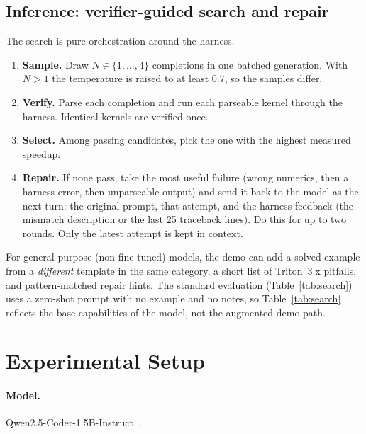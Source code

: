 \documentclass[11pt]{article}
\begin{document}
\subsection{Inference: verifier-guided search and repair}
\label{sec:search}
The search is pure orchestration around the harness. %
\begin{enumerate}
  \item \textbf{Sample.} Draw $N\in\{1,\dots,4\}$ completions in one batched generation. With
        $N>1$ the temperature is raised to at least 0.7, so the samples differ.
  \item \textbf{Verify.} Parse each completion and run each parseable kernel through the harness.
        Identical kernels are verified once.
  \item \textbf{Select.} Among passing candidates, pick the one with the highest measured speedup.
  \item \textbf{Repair.} If none pass, take the most useful failure (wrong numerics, then a harness
        error, then unparseable output) and send it back to the model as the next turn: the original
        prompt, that attempt, and the harness feedback (the mismatch description or the last 25
        traceback lines). Do this for up to two rounds. Only the latest attempt is kept in context.
\end{enumerate}
For general-purpose (non-fine-tuned) models, the demo can add a solved example from a
\emph{different} template in the same category, a short list of Triton~3.x pitfalls, and
pattern-matched repair hints. %
The standard evaluation (Table~\ref{tab:search}) uses a zero-shot prompt with no example and no
notes, so Table~\ref{tab:search} reflects the base capabilities of the model, not the
augmented demo path. %

\section{Experimental Setup}
\label{sec:setup}

\paragraph{Model.} Qwen2.5-Coder-1.5B-Instruct~\cite{hui2024qwen25coder}.
\end{document}
